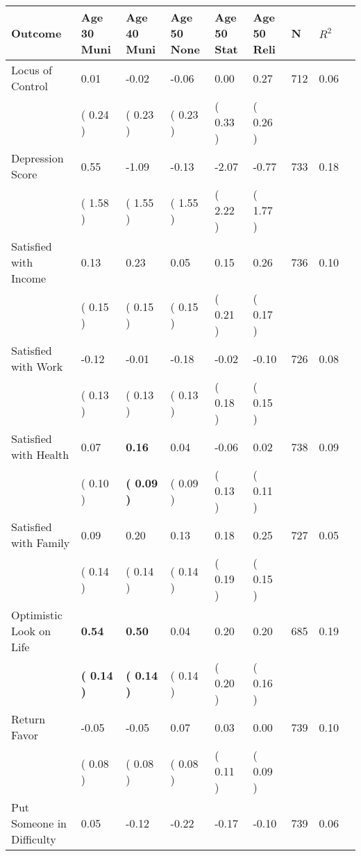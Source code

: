 \begin{tabular}{L{6.2cm} C{1.8cm} C{1.8cm} C{1.8cm} C{1.8cm} C{1.8cm} C{1.8cm} C{0.3cm} C{0.3cm}}
\toprule
 \textbf{Outcome} & \textbf{Age 30 Muni} & \textbf{Age 40 Muni} & \textbf{Age 50 None} & \textbf{Age 50 Stat} & \textbf{Age 50 Reli} & \textbf{N} & \textbf{$ R^2$} \\
\midrule
Locus of Control &      0.01 &     -0.02 &     -0.06 &      0.00 &      0.27  & 712 &       0.06 \\ 
 & (     0.24 ) & (     0.23 ) & (     0.23 ) & (     0.33 ) & (     0.26 )  & \\
Depression Score &      0.55 &     -1.09 &     -0.13 &     -2.07 &     -0.77  & 733 &       0.18 \\ 
 & (     1.58 ) & (     1.55 ) & (     1.55 ) & (     2.22 ) & (     1.77 )  & \\
Satisfied with Income &      0.13 &      0.23 &      0.05 &      0.15 &      0.26  & 736 &       0.10 \\ 
 & (     0.15 ) & (     0.15 ) & (     0.15 ) & (     0.21 ) & (     0.17 )  & \\
Satisfied with Work &     -0.12 &     -0.01 &     -0.18 &     -0.02 &     -0.10  & 726 &       0.08 \\ 
 & (     0.13 ) & (     0.13 ) & (     0.13 ) & (     0.18 ) & (     0.15 )  & \\
Satisfied with Health &      0.07 & \textbf{     0.16} &      0.04 &     -0.06 &      0.02  & 738 &       0.09 \\ 
 & (     0.10 ) & \textbf{(     0.09 )} & (     0.09 ) & (     0.13 ) & (     0.11 )  & \\
Satisfied with Family &      0.09 &      0.20 &      0.13 &      0.18 &      0.25  & 727 &       0.05 \\ 
 & (     0.14 ) & (     0.14 ) & (     0.14 ) & (     0.19 ) & (     0.15 )  & \\
Optimistic Look on Life & \textbf{     0.54} & \textbf{     0.50} &      0.04 &      0.20 &      0.20  & 685 &       0.19 \\ 
 & \textbf{(     0.14 )} & \textbf{(     0.14 )} & (     0.14 ) & (     0.20 ) & (     0.16 )  & \\
Return Favor &     -0.05 &     -0.05 &      0.07 &      0.03 &      0.00  & 739 &       0.10 \\ 
 & (     0.08 ) & (     0.08 ) & (     0.08 ) & (     0.11 ) & (     0.09 )  & \\
Put Someone in Difficulty &      0.05 &     -0.12 &     -0.22 &     -0.17 &     -0.10  & 739 &       0.06 \\ 

\end{tabular}
